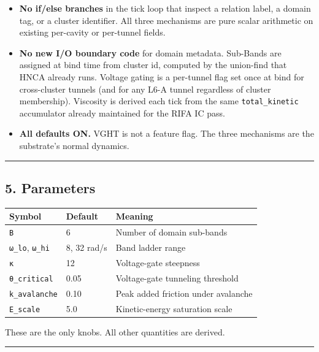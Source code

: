 \documentclass[
  11pt,
  a4paper,
]{article}
\providecommand{\tightlist}{%
  \setlength{\itemsep}{0pt}\setlength{\parskip}{0pt}}
\begin{document}
\begin{itemize}
\tightlist
\item
  \textbf{No if/else branches} in the tick loop that inspect a relation
  label, a domain tag, or a cluster identifier. All three mechanisms are
  pure scalar arithmetic on existing per-cavity or per-tunnel fields.
\item
  \textbf{No new I/O boundary code} for domain metadata. Sub-Bands are
  assigned at bind time from cluster id, computed by the union-find that
  HNCA already runs. Voltage gating is a per-tunnel flag set once at
  bind for cross-cluster tunnels (and for any L6-A tunnel regardless of
  cluster membership). Viscosity is derived each tick from the same
  \texttt{total\_kinetic} accumulator already maintained for the RIFA IC
  pass.
\item
  \textbf{All defaults ON.} VGHT is not a feature flag. The three
  mechanisms are the substrate's normal dynamics.
\end{itemize}

\begin{center}\rule{0.5\linewidth}{0.5pt}\end{center}

\subsection{5. Parameters}\label{parameters}

\begin{longtable}[]{@{}lll@{}}
\toprule\noalign{}
Symbol & Default & Meaning \\
\midrule\noalign{}
\endhead
\bottomrule\noalign{}
\endlastfoot
\texttt{B} & 6 & Number of domain sub-bands \\
\texttt{ω\_lo}, \texttt{ω\_hi} & 8, 32 rad/s & Band ladder range \\
\texttt{κ} & 12 & Voltage-gate steepness \\
\texttt{θ\_critical} & 0.05 & Voltage-gate tunneling threshold \\
\texttt{k\_avalanche} & 0.10 & Peak added friction under avalanche \\
\texttt{E\_scale} & 5.0 & Kinetic-energy saturation scale \\
\end{longtable}

These are the only knobs. All other quantities are derived.

\begin{center}\rule{0.5\linewidth}{0.5pt}\end{center}
\end{document}
